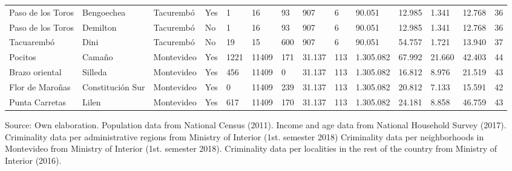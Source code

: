 \documentclass[11pt]{article}
\begin{document}
\begin{landscape}
\begin{longtable}[htbp]{@{}p{1.2cm}p{1cm}p{1.5cm}p{1cm}p{1cm}p{1cm}p{1cm}p{1cm}p{1cm}p{1cm}p{1cm}p{1.2cm}p{1cm}p{1cm}@{}}
Paso de los Toros	&	Bengoechea	&	Tacurembó	&	Yes	&	1	&	16	&	93	&	907	&	6	&	90.051	&	12.985	&	1.341	&	12.768	&	36	\tabularnewline
Paso de los Toros	&	Demilton	&	Tacurembó	&	No	&	1	&	16	&	93	&	907	&	6	&	90.051	&	12.985	&	1.341	&	12.768	&	36	\tabularnewline
Tacuarembó	&	Dini	&	Tacurembó	&	No	&	19	&	15	&	600	&	907	&	6	&	90.051	&	54.757	&	1.721	&	13.940	&	37	\tabularnewline
Pocitos	&	Camaño	&	Montevideo	&	Yes	&	1221	&	11409	&	171	&	31.137	&	113	&	1.305.082	&	67.992	&	21.660	&	42.403	&	44	\tabularnewline
Brazo oriental	&	Silleda	&	Montevideo	&	Yes	&	456	&	11409	&	0	&	31.137	&	113	&	1.305.082	&	16.812	&	8.976	&	21.519	&	43	\tabularnewline
Flor de Maroñas	&	Constitución Sur	&	Montevideo	&	Yes	&	0	&	11409	&	239	&	31.137	&	113	&	1.305.082	&	20.812	&	7.133	&	15.591	&	42	\tabularnewline
Punta Carretas	&	Lilen	&	Montevideo	&	Yes	&	617	&	11409	&	170	&	31.137	&	113	&	1.305.082	&	24.181	&	8.858	&	46.759	&	43	\tabularnewline
\bottomrule
\end{longtable}

Source: Own elaboration. Population data from National Census (2011). Income and age data from National Household Survey (2017). Criminality data per administrative regions from Ministry of Interior (1st. semester 2018) Criminality data per neighborhoods in Montevideo from Ministry of Interior (1st. semester 2018).  Criminality data per localities in the rest of the country from Ministry of Interior (2016).
\end{landscape}
\restoregeometry
\end{document}
